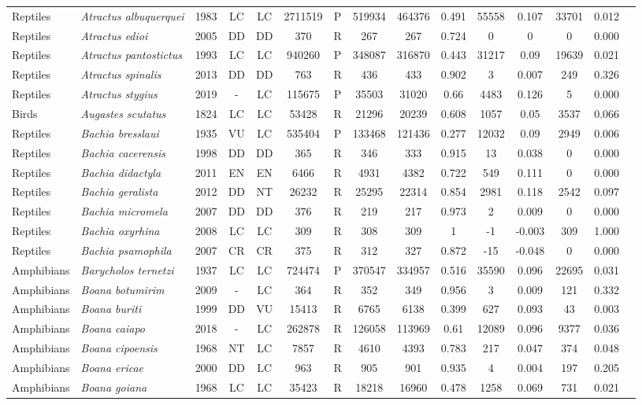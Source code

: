 \documentclass[12pt,openright,oneside,a4paper,english]{abntex2}
\begin{document}
\begin{landscape}
\begin{longtable}{llccccccccccccc}
		Reptiles&\textit{Atractus albuquerquei}&1983&LC&LC&2711519&P&519934&464376&0.491&55558&0.107&33701&0.012\\
		Reptiles&\textit{Atractus edioi}&2005&DD&DD&370&R&267&267&0.724&0&0&0&0.000\\
		Reptiles&\textit{Atractus pantostictus}&1993&LC&LC&940260&P&348087&316870&0.443&31217&0.09&19639&0.021\\
		Reptiles&\textit{Atractus spinalis}&2013&DD&DD&763&R&436&433&0.902&3&0.007&249&0.326\\
		Reptiles&\textit{Atractus stygius}&2019&-&LC&115675&P&35503&31020&0.66&4483&0.126&5&0.000\\
		Birds&\textit{Augastes scutatus}&1824&LC&LC&53428&R&21296&20239&0.608&1057&0.05&3537&0.066\\
		Reptiles&\textit{Bachia bresslaui}&1935&VU&LC&535404&P&133468&121436&0.277&12032&0.09&2949&0.006\\
		Reptiles&\textit{Bachia cacerensis}&1998&DD&DD&365&R&346&333&0.915&13&0.038&0&0.000\\
		Reptiles&\textit{Bachia didactyla}&2011&EN&EN&6466&R&4931&4382&0.722&549&0.111&0&0.000\\
		Reptiles&\textit{Bachia geralista}&2012&DD&NT&26232&R&25295&22314&0.854&2981&0.118&2542&0.097\\
		Reptiles&\textit{Bachia micromela}&2007&DD&DD&376&R&219&217&0.973&2&0.009&0&0.000\\
		Reptiles&\textit{Bachia oxyrhina}&2008&LC&LC&309&R&308&309&1&-1&-0.003&309&1.000\\
		Reptiles&\textit{Bachia psamophila}&2007&CR&CR&375&R&312&327&0.872&-15&-0.048&0&0.000\\
		Amphibians&\textit{Barycholos ternetzi}&1937&LC&LC&724474&P&370547&334957&0.516&35590&0.096&22695&0.031\\
		Amphibians&\textit{Boana botumirim}&2009&-&LC&364&R&352&349&0.956&3&0.009&121&0.332\\
		Amphibians&\textit{Boana buriti}&1999&DD&VU&15413&R&6765&6138&0.399&627&0.093&43&0.003\\
		Amphibians&\textit{Boana caiapo}&2018&-&LC&262878&R&126058&113969&0.61&12089&0.096&9377&0.036\\
		Amphibians&\textit{Boana cipoensis}&1968&NT&LC&7857&R&4610&4393&0.783&217&0.047&374&0.048\\
		Amphibians&\textit{Boana ericae}&2000&DD&LC&963&R&905&901&0.935&4&0.004&197&0.205\\
		Amphibians&\textit{Boana goiana}&1968&LC&LC&35423&R&18218&16960&0.478&1258&0.069&731&0.021\\

\end{longtable}
\end{landscape}
\end{document}

